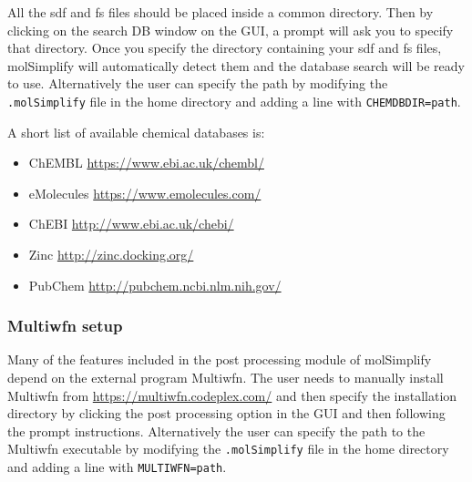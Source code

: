 All the sdf and fs files should be placed inside a common directory. Then by clicking on the search DB window on the GUI, a prompt will ask you to specify that directory. Once you specify the directory containing your sdf and fs files, molSimplify will automatically detect them and the database search will be ready to use. Alternatively the user can specify the path by modifying the \texttt{.molSimplify} file in the home directory and adding a line with \texttt{CHEMDBDIR=path}. 

A short list of available chemical databases is:
\begin{itemize}
\item ChEMBL \url{https://www.ebi.ac.uk/chembl/}
\item eMolecules \url{https://www.emolecules.com/}
\item ChEBI \url{http://www.ebi.ac.uk/chebi/}
\item Zinc \url{http://zinc.docking.org/}
\item PubChem \url{http://pubchem.ncbi.nlm.nih.gov/}
\end{itemize}

\subsubsection{Multiwfn setup}

Many of the features included in the post processing module of molSimplify depend on the external program Multiwfn. The user needs to manually install Multiwfn from \url{https://multiwfn.codeplex.com/} and then specify the installation directory by clicking the post processing option in the GUI and then following the prompt instructions.  Alternatively the user can specify the path to the Multiwfn executable by modifying the \texttt{.molSimplify} file in the home directory and adding a line with \texttt{MULTIWFN=path}.
